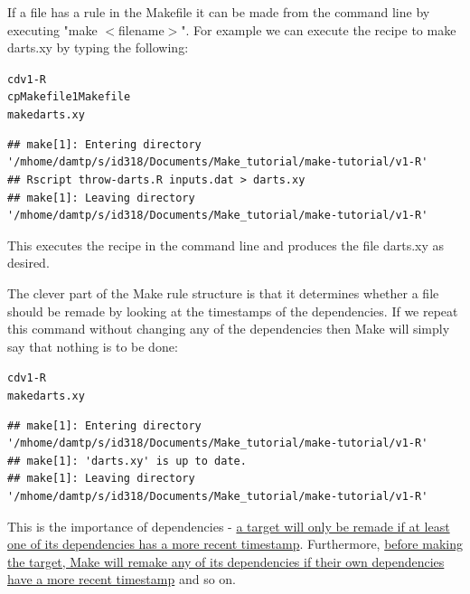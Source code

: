 \documentclass[12pt]{article}\usepackage[]{graphicx}\usepackage[]{color}
\makeatletter
\newenvironment{kframe}{%
 \def\at@end@of@kframe{}%
 \ifinner\ifhmode%
  \def\at@end@of@kframe{\end{minipage}}%
  \begin{minipage}{\columnwidth}%
 \fi\fi%
 \def\FrameCommand##1{\hskip\@totalleftmargin \hskip-\fboxsep
 \colorbox{shadecolor}{##1}\hskip-\fboxsep
     \hskip-\linewidth \hskip-\@totalleftmargin \hskip\columnwidth}%
 \MakeFramed {\advance\hsize-\width
   \@totalleftmargin\z@ \linewidth\hsize
   \@setminipage}}%
 {\par\unskip\endMakeFramed%
 \at@end@of@kframe}
\newenvironment{knitrout}{}{} %
\makeatother
\begin{document}
If a file has a rule in the Makefile it can be made from the command line by executing "make $<$filename$>$". For example we can execute the recipe to make darts.xy by typing the following:

\begin{knitrout}
\color{fgcolor}\begin{kframe}
\begin{alltt}
cd v1-R
cp Makefile1 Makefile
make darts.xy
\end{alltt}

\begin{verbatim}
## make[1]: Entering directory '/mhome/damtp/s/id318/Documents/Make_tutorial/make-tutorial/v1-R'
## Rscript throw-darts.R inputs.dat > darts.xy
## make[1]: Leaving directory '/mhome/damtp/s/id318/Documents/Make_tutorial/make-tutorial/v1-R'
\end{verbatim}
\end{kframe}
\end{knitrout}

This executes the recipe in the command line and produces the file darts.xy as desired. 

The clever part of the Make rule structure is that it determines whether a file should be remade by looking at the timestamps of the dependencies. If we repeat this command without changing any of the dependencies then Make will simply say that nothing is to be done:

\begin{knitrout}
\color{fgcolor}\begin{kframe}
\begin{alltt}
cd v1-R
make darts.xy
\end{alltt}

\begin{verbatim}
## make[1]: Entering directory '/mhome/damtp/s/id318/Documents/Make_tutorial/make-tutorial/v1-R'
## make[1]: 'darts.xy' is up to date.
## make[1]: Leaving directory '/mhome/damtp/s/id318/Documents/Make_tutorial/make-tutorial/v1-R'
\end{verbatim}
\end{kframe}
\end{knitrout}

This is the importance of dependencies - \ul{a target will only be remade if at least one of its dependencies has a more recent timestamp}. Furthermore, \ul{before making the target, Make will remake any of its dependencies if their own dependencies have a more recent timestamp} and so on.
\end{document}
